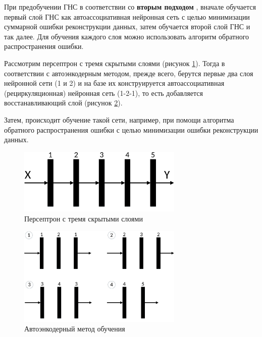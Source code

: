 
При предобучении ГНС в соответствии со \textbf{вторым подходом} \cite{n6}, вначале обучается первый слой ГНС как автоассоциативная нейронная сеть с целью минимизации суммарной ошибки реконструкции данных, затем обучается второй слой ГНС и так далее. Для обучения каждого слоя можно использовать алгоритм обратного распространения ошибки. 

	
Рассмотрим персептрон с тремя скрытыми слоями (рисунок \ref{fig:pic1_5}). Тогда в соответствии с автоэнкодерным методом, прежде всего, берутся первые два слоя нейронной сети (1 и 2) и на базе их конструируется автоассоциативная (рециркуляционная) нейронная сеть (1-2-1), то есть добавляется восстанавливающий слой (рисунок \ref{fig:pic1_6}). 

Затем, происходит обучение такой сети, например, при помощи алгоритма обратного распространения ошибки с целью минимизации ошибки реконструкции данных. 
	
\begin{figure}[H]
  \centering
  \includegraphics[width=0.7\textwidth]{man-source/images/ch1/pic1-5.pdf}
  \caption{Персептрон с тремя скрытыми слоями}
  \label{fig:pic1_5}
\end{figure}	

\begin{figure}[H]
  \centering
  \includegraphics[width=0.7\textwidth]{man-source/images/ch1/pic1-6.pdf}
  \caption{Автоэнкодерный метод обучения}
  \label{fig:pic1_6}
\end{figure}
	
